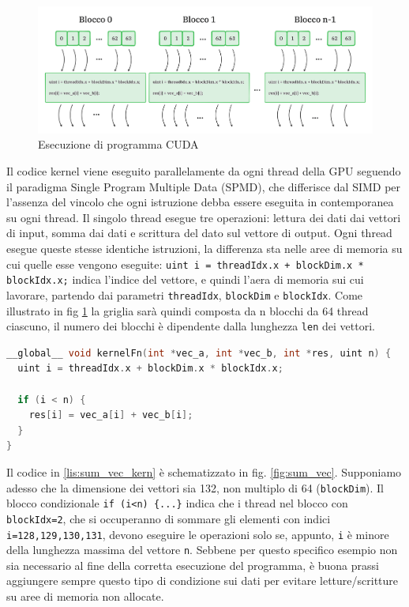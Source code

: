 \begin{figure}[ht]
    \centering
    \includegraphics[width=.9\linewidth]{images/chapter2/grid.png}
    \caption{Esecuzione di programma CUDA}
    \label{fig:grid}
\end{figure}

Il codice kernel viene eseguito parallelamente da ogni thread della GPU seguendo il paradigma Single Program Multiple Data (\gls{SPMD}), che differisce dal SIMD per l'assenza del vincolo che ogni istruzione debba essere eseguita in contemporanea su ogni thread. Il singolo thread esegue tre operazioni: lettura dei dati dai vettori di input, somma dai dati e scrittura del dato sul vettore di output. Ogni thread esegue queste stesse identiche istruzioni, la differenza sta nelle aree di memoria su cui quelle esse vengono eseguite: \verb|uint i = threadIdx.x + blockDim.x * blockIdx.x;| indica l'indice del vettore, e quindi l'aera di memoria sui cui lavorare, partendo dai parametri \verb|threadIdx|, \verb|blockDim| e \verb|blockIdx|. Come illustrato in fig \ref{fig:grid} la griglia sarà quindi composta da n blocchi da 64 thread ciascuno, il numero dei blocchi è dipendente dalla lunghezza \verb|len| dei vettori.

\vspace{5mm}
\begin{lstlisting}[language=C++, caption=Kernel CUDA di somma di vettori, label=lis:sum_vec_kern]
__global__ void kernelFn(int *vec_a, int *vec_b, int *res, uint n) {
  uint i = threadIdx.x + blockDim.x * blockIdx.x;

  if (i < n) {
    res[i] = vec_a[i] + vec_b[i];
  }
}\end{lstlisting}
\vspace{5mm}

Il codice in \ref{lis:sum_vec_kern} è schematizzato in fig. \ref{fig:sum_vec}. Supponiamo adesso che la dimensione dei vettori sia 132, non multiplo di 64 (\verb|blockDim|). Il blocco condizionale \verb|if (i<n) {...}| indica che i thread nel blocco con \verb|blockIdx=2|, che si occuperanno di sommare gli elementi con indici \verb|i=128,129,130,131|, devono eseguire le operazioni solo se, appunto, \verb|i| è minore della lunghezza massima del vettore \verb|n|. Sebbene per questo specifico esempio non sia necessario al fine della corretta esecuzione del programma, è buona prassi aggiungere sempre questo tipo di condizione sui dati per evitare letture/scritture su aree di memoria non allocate.

